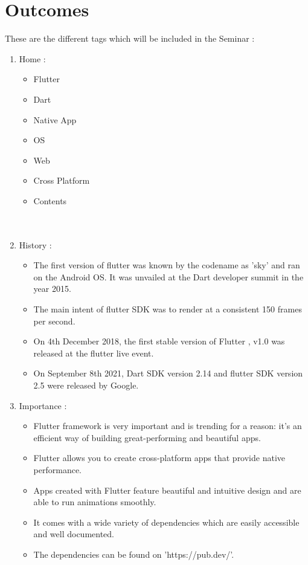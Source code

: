\documentclass[11pt,a4paper,oneside,openright]{report}
\begin{document}
{{\section{Outcomes}
\hspace{0.2in} These are the different tags which will be included in the Seminar :
\begin{enumerate}
\item Home :
\begin{itemize}
\item Flutter
\item Dart
\item Native App
\item OS
\item Web
\item Cross Platform
\item Contents\\
\\
\\
\end{itemize}
\item History :  
	\begin{itemize}
	\item The first version of flutter was known by the codename as 'sky' and ran on the Android OS. It was unvailed at the Dart developer summit in the year 2015.
	\item The main intent of flutter SDK was to render at a consistent 150 frames per second.
	\item On 4th December 2018, the first stable version of Flutter , v1.0 was released at the flutter live event.
	\item On September 8th 2021, Dart SDK version 2.14 and flutter SDK version 2.5 were released by Google.
	\end{itemize}

\item Importance :
\begin{itemize}
\item Flutter framework is very important and is trending for a reason: it's an efficient way of building great-performing and beautiful apps.
\item Flutter allows you to create cross-platform apps that provide native performance. 
\item Apps created with Flutter feature beautiful and intuitive design and are able to run animations smoothly. 
\item   It comes with a wide variety of dependencies which are easily accessible and well documented. 
\item The dependencies can be found on 'https://pub.dev/'.
\end{itemize} 


\end{enumerate}}}
\end{document}
